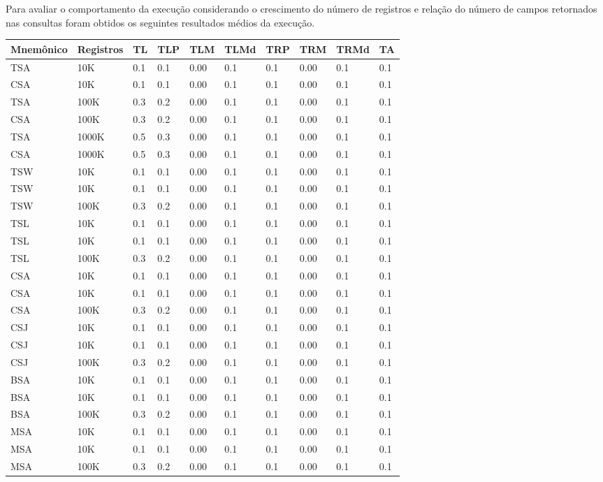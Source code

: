 \documentclass[12pt, a4paper]{article}
\begin{document}
Para avaliar o comportamento da execução considerando o crescimento do número de registros e relação do
número de campos retornados nas consultas foram obtidos os seguintes resultados médios da execução.

\begin{tabular}{l l l l l l l l l l}
\hline
Mnemônico & Registros & TL &TLP &TLM & TLMd & TRP & TRM & TRMd & TA \\
\hline
TSA & 10K & 0.1 & 0.1 & 0.00 & 0.1 & 0.1  & 0.00 & 0.1 & 0.1 \\
CSA & 10K & 0.1 & 0.1 & 0.00 & 0.1 & 0.1  & 0.00 & 0.1 & 0.1 \\
TSA & 100K & 0.3 & 0.2 & 0.00 & 0.1 & 0.1  & 0.00 & 0.1 & 0.1 \\
CSA & 100K & 0.3 & 0.2 & 0.00 & 0.1 & 0.1  & 0.00 & 0.1 & 0.1 \\
TSA & 1000K & 0.5 & 0.3 & 0.00 & 0.1 & 0.1  & 0.00 & 0.1 & 0.1 \\
CSA & 1000K & 0.5 & 0.3 & 0.00 & 0.1 & 0.1  & 0.00 & 0.1 & 0.1 \\


TSW & 10K & 0.1 & 0.1 & 0.00 & 0.1 & 0.1  & 0.00 & 0.1 & 0.1 \\
TSW & 10K & 0.1 & 0.1 & 0.00 & 0.1 & 0.1  & 0.00 & 0.1 & 0.1 \\
TSW & 100K & 0.3 & 0.2 & 0.00 & 0.1 & 0.1  & 0.00 & 0.1 & 0.1 \\

TSL & 10K & 0.1 & 0.1 & 0.00 & 0.1 & 0.1  & 0.00 & 0.1 & 0.1 \\
TSL & 10K & 0.1 & 0.1 & 0.00 & 0.1 & 0.1  & 0.00 & 0.1 & 0.1 \\
TSL & 100K & 0.3 & 0.2 & 0.00 & 0.1 & 0.1  & 0.00 & 0.1 & 0.1 \\


CSA & 10K & 0.1 & 0.1 & 0.00 & 0.1 & 0.1  & 0.00 & 0.1 & 0.1 \\
CSA & 10K & 0.1 & 0.1 & 0.00 & 0.1 & 0.1  & 0.00 & 0.1 & 0.1 \\
CSA & 100K & 0.3 & 0.2 & 0.00 & 0.1 & 0.1  & 0.00 & 0.1 & 0.1 \\


CSJ & 10K & 0.1 & 0.1 & 0.00 & 0.1 & 0.1  & 0.00 & 0.1 & 0.1 \\
CSJ & 10K & 0.1 & 0.1 & 0.00 & 0.1 & 0.1  & 0.00 & 0.1 & 0.1 \\
CSJ & 100K & 0.3 & 0.2 & 0.00 & 0.1 & 0.1  & 0.00 & 0.1 & 0.1 \\

BSA & 10K & 0.1 & 0.1 & 0.00 & 0.1 & 0.1  & 0.00 & 0.1 & 0.1 \\
BSA & 10K & 0.1 & 0.1 & 0.00 & 0.1 & 0.1  & 0.00 & 0.1 & 0.1 \\
BSA & 100K & 0.3 & 0.2 & 0.00 & 0.1 & 0.1  & 0.00 & 0.1 & 0.1 \\


MSA & 10K & 0.1 & 0.1 & 0.00 & 0.1 & 0.1  & 0.00 & 0.1 & 0.1 \\
MSA & 10K & 0.1 & 0.1 & 0.00 & 0.1 & 0.1  & 0.00 & 0.1 & 0.1 \\
MSA & 100K & 0.3 & 0.2 & 0.00 & 0.1 & 0.1  & 0.00 & 0.1 & 0.1 \\

\hline
\end{tabular}
\end{document}
